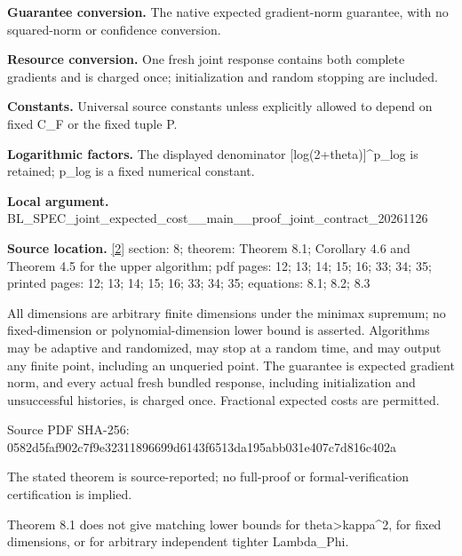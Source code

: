 \documentclass[10pt,a4paper]{article}
\begin{document}
\textbf{Guarantee conversion.} The native expected gradient-norm guarantee, with no squared-norm or confidence conversion.



\textbf{Resource conversion.} One fresh joint response contains both complete gradients and is charged once; initialization and random stopping are included.



\textbf{Constants.} Universal source constants unless explicitly allowed to depend on fixed C\_F or the fixed tuple P.



\textbf{Logarithmic factors.} The displayed denominator [log(2+theta)]\textasciicircum{}p\_log is retained; p\_log is a fixed numerical constant.



\textbf{Local argument.} BL\_SPEC\_joint\_expected\_c\allowbreak{}ost\_\_main\_\_proof\_joint\_c\allowbreak{}ontract\_20261126



\textbf{Source location.} \href{https://github.com/WU-Wendao/Colombo/blob/main/colombo_sensorium/Complexity_altas/data/sources/colombo/SFO_JOINT_20261126/manuscript.pdf}{[2]} section: 8; theorem: Theorem 8.1; Corollary 4.6 and Theorem 4.5 for the upper algorithm; pdf pages: 12; 13; 14; 15; 16; 33; 34; 35; printed pages: 12; 13; 14; 15; 16; 33; 34; 35; equations: 8.1; 8.2; 8.3



All dimensions are arbitrary finite dimensions under the minimax supremum; no fixed-dimension or polynomial-dimension lower bound is asserted. Algorithms may be adaptive and randomized, may stop at a random time, and may output any finite point, including an unqueried point. The guarantee is expected gradient norm, and every actual fresh bundled response, including initialization and unsuccessful histories, is charged once. Fractional expected costs are permitted.



Source PDF SHA-256: 0582d5faf902c7f9e3231189\allowbreak{}6699d6143f6513da195abb03\allowbreak{}1e407c7d816c402a



The stated theorem is source-reported; no full-proof or formal-verification certification is implied.



Theorem 8.1 does not give matching lower bounds for theta>kappa\textasciicircum{}2, for fixed dimensions, or for arbitrary independent tighter Lambda\_Phi.
\end{document}

